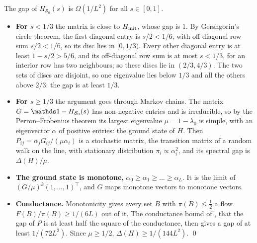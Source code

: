 \documentclass[handoutsbeamer.tex]{subfiles}
\begin{document}
\begin{frame}
\onp{\scriptsize}
\begin{lem}\label{lem:ch04:gap}
The gap of $H_{\mathcal S_0}(s)$ is $\Omega(1/L^2)$ for all $s\in[0,1]$.
\end{lem}
\begin{itemize}\setlength\itemsep{0.25em}
    \item \textbf{For $s < 1/3$} the matrix is close to $H_{\rm init}$, whose gap is $1$. By Gershgorin's circle theorem, the first diagonal entry is $s/2 < 1/6$, with off-diagonal row sum $s/2 < 1/6$, so its disc lies in $[0,1/3)$. Every other diagonal entry is at least $1-s/2 > 5/6$, and its off-diagonal row sum is at most $s < 1/3$, for an interior row has two neighbours; so these discs lie in $(2/3, 4/3)$. The two sets of discs are disjoint, so one eigenvalue lies below $1/3$ and all the others above $2/3$: the gap is at least $1/3$.
    \item \textbf{For $s \ge 1/3$} the argument goes through Markov chains. The matrix $G = \one - H_{\mathcal S_0}(s)$ has non-negative entries and is irreducible, so by the Perron--Frobenius theorem its largest eigenvalue $\mu = 1-\lambda_0$ is simple, with an eigenvector $\alpha$ of positive entries: the ground state of $H$. Then $P_{ij} = \alpha_jG_{ij}/(\mu\alpha_i)$ is a stochastic matrix, the transition matrix of a random walk on the line, with stationary distribution $\pi_i \propto \alpha_i^2$, and its spectral gap is $\Delta(H)/\mu$.
    \item \textbf{The ground state is monotone,} $\alpha_0\ge\alpha_1\ge\dots\ge\alpha_L$. It is the limit of $(G/\mu)^k(1,\dots,1)^\top$, and $G$ maps monotone vectors to monotone vectors.
    \item \textbf{Conductance.} Monotonicity gives every set $B$ with $\pi(B)\le\tfrac12$ a flow $F(B)/\pi(B)\ge 1/(6L)$ out of it. The conductance bound of \citet{sinclair1989approximate}, that the gap of $P$ is at least half the square of the conductance, then gives a gap of at least $1/(72L^2)$. Since $\mu \ge 1/2$, $\Delta(H) \ge 1/(144L^2)$. \qed
\end{itemize}
\end{frame}
\end{document}

